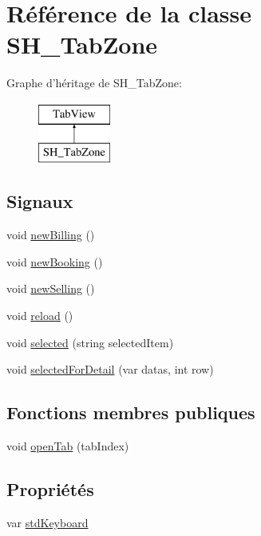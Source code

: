 \hypertarget{classSH__TabZone}{\section{Référence de la classe S\-H\-\_\-\-Tab\-Zone}
\label{classSH__TabZone}
}
Graphe d'héritage de S\-H\-\_\-\-Tab\-Zone\-:\begin{figure}[H]
\begin{center}
\leavevmode
\includegraphics[height=2.000000cm]{classSH__TabZone}
\end{center}
\end{figure}
\subsection*{Signaux}
\begin{DoxyCompactItemize}
\item 
void \hyperlink{classSH__TabZone_a6dce834477f22e68a3c35269d69d942f}{new\-Billing} ()
\item 
void \hyperlink{classSH__TabZone_aa83131a41d95f9cd16747d89c2c530aa}{new\-Booking} ()
\item 
void \hyperlink{classSH__TabZone_a12ef2e459df85b55e462a0461a5bc15b}{new\-Selling} ()
\item 
void \hyperlink{classSH__TabZone_a22fe45dad2c65c83b794df80fe34c131}{reload} ()
\item 
void \hyperlink{classSH__TabZone_ad500416727acbeb29222c15f99edb496}{selected} (string selected\-Item)
\item 
void \hyperlink{classSH__TabZone_aebb988f357ac869b51c09c7b76b5a11b}{selected\-For\-Detail} (var datas, int row)
\end{DoxyCompactItemize}
\subsection*{Fonctions membres publiques}
\begin{DoxyCompactItemize}
\item 
void \hyperlink{classSH__TabZone_a9ead4ec3d837849d00958ce6b8b320da}{open\-Tab} (tab\-Index)
\end{DoxyCompactItemize}
\subsection*{Propriétés}
\begin{DoxyCompactItemize}
\item 
var \hyperlink{classSH__TabZone_a23223ca4d8158e2f50564d92364f6e14}{std\-Keyboard}
\end{DoxyCompactItemize}


